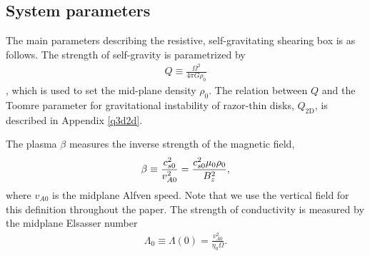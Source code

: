 

\subsection{System parameters}
The main parameters describing the resistive, self-gravitating
shearing box is as follows. The strength of self-gravity is
parametrized by 
\begin{align}
  Q \equiv \frac{\Omega^2}{4\pi G\rho_0}
\end{align}
\citep{mamat10}, which is used to set the mid-plane density $\rho_0$. 
The relation between $Q$ and the Toomre parameter for gravitational
instability of razor-thin disks, $Q_\mathrm{2D}$, is described in
Appendix \ref{q3d2d}.  

The plasma $\beta$ measures the inverse strength of the  
magnetic field,  
\begin{align}
  \beta \equiv \frac{c_{s0}^2}{v_{A0}^2} =
  \frac{c_{s0}^2\mu_0\rho_0}{B_z^2},  
\end{align}
where $v_{A0}$ is the midplane Alfven speed. Note that we use 
the vertical field for this definition throughout the paper. The
strength of conductivity is measured by the midplane Elsasser number  
\begin{align}
  \Lambda_0 \equiv\Lambda(0) =  \frac{v_{A0}^2}{\eta_0\Omega}. %
\end{align}

